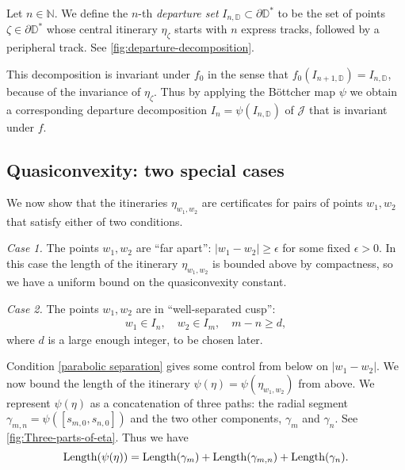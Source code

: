 \begin{definition}
Let $n \in \mathbb N$. We define the $n$-th \emph{departure set} $I_{n, \mathbb D} \subset \partial \mathbb D ^*$ to be the set of points $\zeta \in \partial \mathbb D^*$ whose central itinerary $\eta_{\zeta}$ starts with $n$ express tracks, followed by a peripheral track.
See \cref{fig:departure-decomposition}.
\end{definition}

This decomposition is invariant under $f_0$ in the sense that $f_0(I_{n+1, \mathbb D})=I_{n, \mathbb D}$, because of the invariance of $\eta _\zeta$.
Thus by applying the Böttcher map $\psi$ we obtain a corresponding departure decomposition $I_n = \psi(I_{n, \mathbb D})$ of $\mathcal J$ that is invariant under $f$.


\newpage

\subsection{Quasiconvexity: two special cases}
We now show that the itineraries $\eta_{w_1,w_2}$ are certificates for pairs of points $w_1,w_2$ that satisfy either of two conditions.

\emph{Case 1.} The points $w_1,w_2$ are ``far apart'': $|w_1-w_2| \geq \epsilon$ for some fixed $\epsilon >0$.
In this case the length of the itinerary $\eta_{w_1,w_2}$ is bounded above by compactness, so we have a uniform bound on the quasiconvexity constant.

\emph{Case 2.} The points $w_1,w_2$ are in ``well-separated cusp'':
\begin{align} \label{parabolic separation}
	w_1 \in I_n, \quad w_2 \in I_m, \quad m-n \geq d,
\end{align}
where $d$ is a large enough integer, to be chosen later. 

Condition \eqref{parabolic separation} gives some control from below on $|w_1-w_2|$. We now bound the length of the itinerary $\psi(\eta)=\psi(\eta_{w_1,w_2})$ from above.
We represent $\psi(\eta)$ as a concatenation of three paths: the radial segment $\gamma_{m,n}=\psi([s_{m,0},s_{n,0}])$ and the two other components, $\gamma _m$ and $\gamma_n$. See \cref{fig:Three-parts-of-eta}.
Thus we have
\begin{equation}
	\operatorname{Length}(\psi(\eta))=\operatorname{Length}(\gamma_m)+\operatorname{Length}(\gamma_{m,n})+\operatorname{Length}(\gamma_n).
\end{equation}


